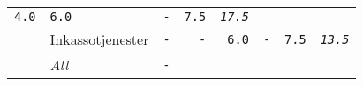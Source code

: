 \documentclass[11pt,A4paper,]{article}
\begin{document}
\begin{longtable}[]{@{}llrrrrrr@{}}
\begin{minipage}[t]{0.12\columnwidth}
\texttt{4.0}\strut
\end{minipage} & \begin{minipage}[t]{0.12\columnwidth}\raggedleft\strut
\texttt{6.0}\strut
\end{minipage} & \begin{minipage}[t]{0.12\columnwidth}\raggedleft\strut
\texttt{-}\strut
\end{minipage} & \begin{minipage}[t]{0.12\columnwidth}\raggedleft\strut
\texttt{7.5}\strut
\end{minipage} & \begin{minipage}[t]{0.12\columnwidth}\raggedleft\strut
\emph{\texttt{17.5}}\strut
\end{minipage}\tabularnewline
\begin{minipage}[t]{0.12\columnwidth}\raggedright\strut
\strut
\end{minipage} & \begin{minipage}[t]{0.12\columnwidth}\raggedright\strut
Inkassotjenester\strut
\end{minipage} & \begin{minipage}[t]{0.12\columnwidth}\raggedleft\strut
\texttt{-}\strut
\end{minipage} & \begin{minipage}[t]{0.12\columnwidth}\raggedleft\strut
\texttt{-}\strut
\end{minipage} & \begin{minipage}[t]{0.12\columnwidth}\raggedleft\strut
\texttt{6.0}\strut
\end{minipage} & \begin{minipage}[t]{0.12\columnwidth}\raggedleft\strut
\texttt{-}\strut
\end{minipage} & \begin{minipage}[t]{0.12\columnwidth}\raggedleft\strut
\texttt{7.5}\strut
\end{minipage} & \begin{minipage}[t]{0.12\columnwidth}\raggedleft\strut
\emph{\texttt{13.5}}\strut
\end{minipage}\tabularnewline
\begin{minipage}[t]{0.12\columnwidth}\raggedright\strut
\strut
\end{minipage} & \begin{minipage}[t]{0.12\columnwidth}\raggedright\strut
\emph{All}\strut
\end{minipage} & \begin{minipage}[t]{0.12\columnwidth}\raggedleft\strut
\emph{\texttt{-}}\strut

\end{minipage}
\end{longtable}
\end{document}
